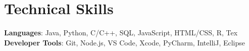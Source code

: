\documentclass[letterpaper,11pt]{article}
\begin{document}
\section{Technical Skills}
 \begin{itemize}[leftmargin=0.1in, label={}]
    \small{\item{
     \textbf{Languages}{: Java, Python, C/C++, SQL, JavaScript, HTML/CSS, R, Tex} \\
     \textbf{Developer Tools}{: Git, Node.js, VS Code, Xcode, PyCharm, IntelliJ, Eclipse} \\
     
    }}
 \end{itemize}




%
\end{document}
